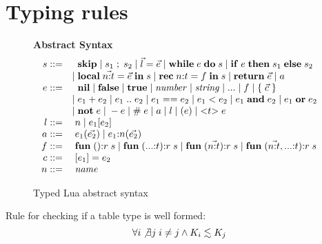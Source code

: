 \section{Typing rules}

\begin{figure}[!ht]
\textbf{Abstract Syntax}\\
\dstart
$$
\begin{array}{rl}
s ::= & \;\; \mathbf{skip} \; | \;
s_{1} \; ; \; s_{2} \; | \;
\vec{l} = \vec{e}  \; | \;
\mathbf{while} \; e \; \mathbf{do} \; s \; | \;
\mathbf{if} \; e \; \mathbf{then} \; s_{1} \; \mathbf{else} \; s_{2}\\
& | \; \mathbf{local} \; \vec{n{:}t} = \vec{e} \; \mathbf{in} \; s \; | \;
\mathbf{rec} \; n{:}t = f \; \mathbf{in} \; s \; | \;
\mathbf{return} \; \vec{e} \; | \;
a\\
e ::= & \;\; \mathbf{nil} \; | \;
\mathbf{false} \; | \;
\mathbf{true} \; | \;
{\it number} \; | \;
{\it string} \; | \;
{...} \; | \;
f \; | \;
\{ \; \vec{c} \; \} \\
& | \; e_{1} + e_{2} \; | \;
e_{1} \; {..} \; e_{2} \; | \;
e_{1} == e_{2} \; | \;
e_{1} < e_{2} \; | \;
e_{1} \; \mathbf{and} \; e_{2} \; | \;
e_{1} \; \mathbf{or} \; e_{2} \\
& | \; \mathbf{not} \; e \; | \;
- e \; | \;
\# \; e \; | \;
a \; | \;
l \; | \;
(e) \; | \;
{<}t{>} \; e\\
l ::= & \; n \; | \;
e_{1}[e_{2}]\\
a ::= & \; e_{1}(\vec{e_{2}}) \; | \;
e_{1}{:}n(\vec{e_{2}})\\
f ::= & \; \mathbf{fun} \; (){:}r \; s \; | \;
\mathbf{fun} \; ({...}{:}t){:}r \; s \; | \;
\mathbf{fun} \; (\vec{n{:}t}){:}r \; s \; | \;
\mathbf{fun} \; (\vec{n{:}t},{...}{:}t){:}r \; s\\
c ::= & \; [e_{1}] = e_{2}\\
n ::= & \; {\it name}\\
\end{array}
$$
\dend
\caption{Typed Lua abstract syntax}
\label{fig:syntax}
\end{figure}

Rule for checking if a table type is well formed:
\[
\forall i \not\exists j \; i \not= j \wedge K_{i} \lesssim K_{j}
\]


